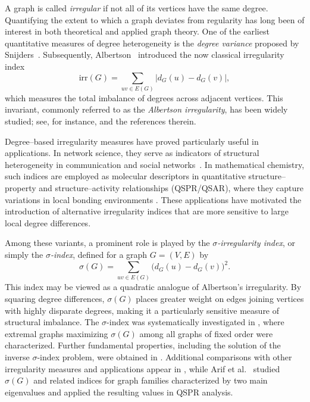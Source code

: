 \documentclass[preprint,12pt]{elsarticle}
\begin{document}
A graph is called \emph{irregular} if not all of its vertices have the same degree.
Quantifying the extent to which a graph deviates from regularity has long been of
interest in both theoretical and applied graph theory.
One of the earliest quantitative measures of degree heterogeneity is the
\emph{degree variance} proposed by Snijders~\cite{Snijders1981}.
Subsequently, Albertson~\cite{Albertson1997} introduced the now classical
irregularity index
\[
\mathrm{irr}(G)=\sum_{uv\in E(G)} |d_G(u)-d_G(v)|,
\]
which measures the total imbalance of degrees across adjacent vertices.
This invariant, commonly referred to as the \emph{Albertson irregularity},
has been widely studied; see, for instance,
\cite{Albertson1997,Abdo2014,Hansen2005} and the references therein.

Degree–based irregularity measures have proved particularly useful in applications.
In network science, they serve as indicators of structural heterogeneity in
communication and social networks~\cite{Estrada2010}.
In mathematical chemistry, such indices are employed as molecular descriptors
in quantitative structure–property and structure–activity relationships
(QSPR/QSAR), where they capture variations in local bonding environments
\cite{Gutman2005,Reti2018QSPR}.
These applications have motivated the introduction of alternative irregularity
indices that are more sensitive to large local degree differences.

Among these variants, a prominent role is played by the
\emph{$\sigma$-irregularity index}, or simply the \emph{$\sigma$-index}, defined
for a graph $G=(V,E)$ by
\[
\sigma(G)=\sum_{uv\in E(G)}\bigl(d_G(u)-d_G(v)\bigr)^2.
\]
This index may be viewed as a quadratic analogue of Albertson’s irregularity.
By squaring degree differences, $\sigma(G)$ places greater weight on edges
joining vertices with highly disparate degrees, making it a particularly
sensitive measure of structural imbalance.
The $\sigma$-index was systematically investigated in
\cite{Abdo2018}, where extremal graphs maximizing $\sigma(G)$ among all graphs of
fixed order were characterized.
Further fundamental properties, including the solution of the inverse
$\sigma$-index problem, were obtained in \cite{Gutman2018}.
Additional comparisons with other irregularity measures and applications appear
in \cite{Reti2019}, while Arif et al.~\cite{Arif2023} studied $\sigma(G)$ and
related indices for graph families characterized by two main eigenvalues and
applied the resulting values in QSPR analysis.
\end{document}

